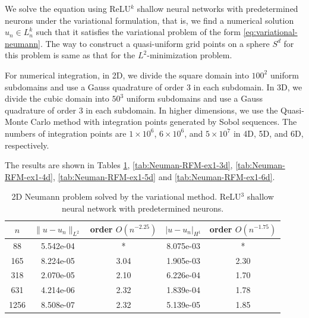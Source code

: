 \documentclass{article}
\theoremstyle{remark}
\begin{document}
We solve the equation using ReLU$^k$ shallow neural networks 
with predetermined neurons under the variational formulation, that is, we find a numerical solution $u_n \in L_n^k$ such that it satisfies the variational problem of the form \eqref{eq:variational-neumann}. 
The way to construct a quasi-uniform grid points on a sphere $S^d$ for this problem is same as that for the $L^2$-minimization problem. 

For numerical integration, in 2D, we divide the square domain into $100^2$ uniform subdomains and use a Gauss quadrature of order $3$ in each subdomain.
In 3D, we divide the cubic domain into $50^3$ uniform subdomains and use a Gauss quadrature of order $3$ in each subdomain.
In higher dimensions, we use the Quasi-Monte Carlo method with integration points generated by Sobol sequences.
The numbers of integration points are $1\times10^6$, $6\times10^6$, and $5\times10^7$ in 4D, 5D, and 6D, respectively.


The results are shown in Tables \ref{tab:Neuman-RFM-ex1-2d}, \ref{tab:Neuman-RFM-ex1-3d}, \ref{tab:Neuman-RFM-ex1-4d}, \ref{tab:Neuman-RFM-ex1-5d} and \ref{tab:Neuman-RFM-ex1-6d}.

    \begin{table}[H]
        \centering
        \begin{tabular}{c|c|c|c|c}
$n$ & 	 $\|u-u_n \|_{L^2}$ & 	 order $O(n^{-2.25})$  & $ |u-u_n |_{H^1}$ & 	 order $O(n^{-1.75})$\\ \hline \hline 
88 		 &  5.542e-04 &  		*   &  8.075e-03 &  *   \\ \hline  
165 		 &  8.224e-05 &  		 3.04  &  1.905e-03 &  2.30  \\ \hline  
318 		 &  2.070e-05 &  		 2.10  &  6.226e-04 &  1.70  \\ \hline  
631 		 &  4.214e-06 &  		 2.32  &  1.839e-04 &  1.78  \\ \hline  
1256 		 &  8.508e-07 &  		 2.32  &  5.139e-05 &  1.85  \\ \hline  
        \end{tabular}
        \caption{2D Neumann problem solved by the variational method. ReLU$^3$ shallow neural network with predetermined neurons.}
        \label{tab:Neuman-RFM-ex1-2d}
    \end{table}
\end{document}
